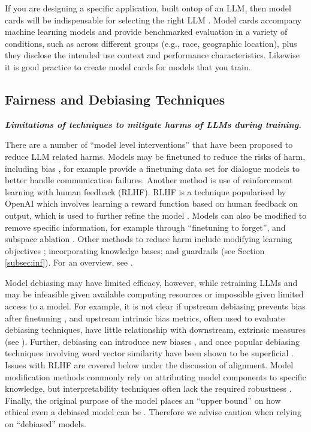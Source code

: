 If you are designing a specific application, built ontop of an LLM, then model cards will be indispensable for selecting the right LLM \citep{mitchell_model_2019}. Model cards accompany machine learning models and provide benchmarked evaluation in a variety of conditions, such as across different groups (e.g., race, geographic location), plus they disclose the intended use context and performance characteristics. Likewise it is good practice to create model cards for models that you train. 


\subsection{Fairness and Debiasing Techniques}\label{sec:debias} \noindent\textbf{\textit{Limitations of techniques to mitigate harms of LLMs during training.}}
\newline 

\noindent There are a number of ``model level interventions'' \citep{kumar_language_2022} that have been proposed to reduce LLM related harms. Models may be finetuned to reduce the risks of harm, including bias \citep{subramanian_fairness-aware_2021}, for example \citet{ung_saferdialogues_2022} provide a finetuning data set for dialogue models to better handle communication failures. Another method is use of reinforcement learning with human feedback (RLHF). RLHF is a technique popularised by OpenAI which involves learning a reward function based on human feedback on output, which is used to further refine the model \citep{huang_survey_2023}. Models can also be modified to remove specific information, for example through ``finetuning to forget'', and subspace ablation \citep{anwar2024foundational}. Other methods to reduce harm include modifying learning objectives \citep{guo_auto-debias_2022}; incorporating knowledge bases; and guardrails (see Section \cref{subsec:inf}). For an overview, see \citet{kumar_language_2022}.

Model debiasing may have limited efficacy, however, while retraining LLMs and may be infeasible given available computing resources or impossible given limited access to a model. For example, it is not clear if upstream debiasing prevents bias after finetuning \citep{steed_upstream_2022} \citep[cf.][]{liang_towards_2020}, and upstream intrinsic bias metrics, often used to evaluate debiasing techniques, have little relationship with downstream, extrinsic measures \citep{cao_intrinsic_2022,goldfarb-tarrant_intrinsic_2021, delobelle_measuring_2022} (see ). Further, debiasing can introduce new biases \citep{xu_detoxifying_2021}, and once popular debiasing techniques involving word vector similarity have been shown to be superficial \citep{gonen_lipstick_2019}. Issues with RLHF are covered below under the discussion of alignment. Model modification methods commonly rely on attributing model components to specific knowledge, but interpretability techniques often lack the required robustness \citep{anwar2024foundational}. Finally, the original purpose of the model places an ``upper bound'' on how ethical even a debiased model can be \citep{kasirzadeh2021ethical}. Therefore we advise caution when relying on ``debiased'' models.

